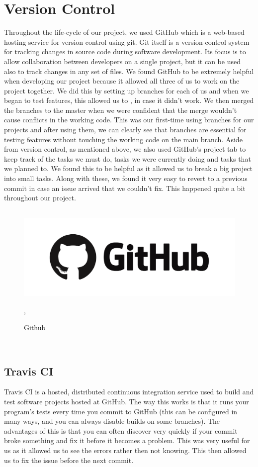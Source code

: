 \section{Version Control}
Throughout the life-cycle of our project, we used GitHub which is a web-based hosting service for version control using git. Git itself is a version-control system for tracking changes in source code during software development. Its focus is to allow collaboration between developers on a single project, but it can be used also to track changes in any set of files. We found GitHub to be extremely helpful when developing our project because it allowed all three of us to work on the project together. We did this by setting up branches for each of us and when we began to test features, this allowed us to , in case it didn’t work. We then merged the branches to the master when we were confident that the merge wouldn’t cause conflicts in the working code. This was our first-time using branches for our projects and after using them, we can clearly see that branches are essential for testing features without touching the working code on the main branch. Aside from version control, as mentioned above, we also used GitHub’s project tab to keep track of the tasks we must do, tasks we were currently doing and tasks that we planned to. We found this to be helpful as it allowed us to break a big project into small tasks. Along with these, we found it very easy to revert to a previous commit in case an issue arrived that we couldn’t fix. This happened quite a bit throughout our project.
\begin{figure}[ht]
\renewcommand\thefigure{3.2}
\centering
\includegraphics[width=13cm, height=5cm]{img/github.png},
\caption{Github}
\label{Github VC}
\end{figure}\\



\newpage\subsection{Travis CI}
Travis CI is a hosted, distributed continuous integration service used to build and test software projects hosted at GitHub. The way this works is that it runs your program's tests every time you commit to GitHub (this can be configured in many ways, and you can always disable builds on some branches). The advantages of this is that you can often discover very quickly if your commit broke something and fix it before it becomes a problem. This was very useful for us as it allowed us to see the errors rather then not knowing. This then allowed us to fix the issue before the next commit. 

